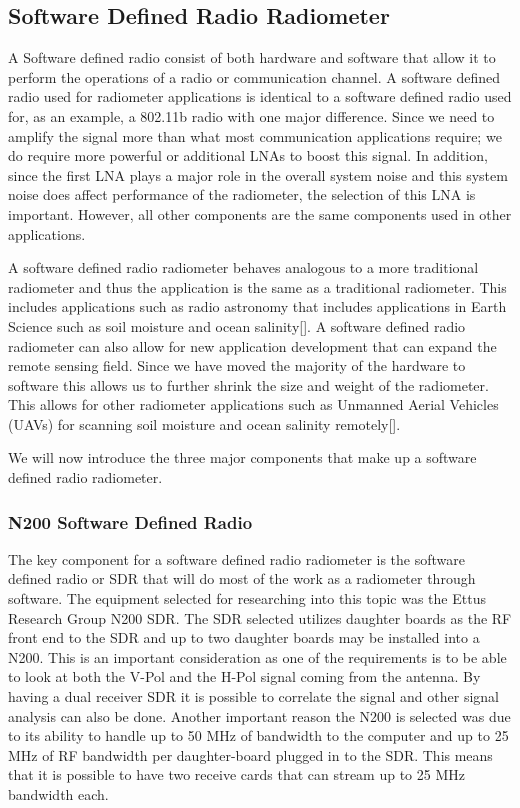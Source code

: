 
\subsection{Software Defined Radio Radiometer}

A Software defined radio consist of both hardware and software that allow it to perform the operations of a radio or communication channel.  A software defined radio used for radiometer applications is identical to a software defined radio used for, as an example, a 802.11b radio with one major difference.  Since we need to amplify the signal more than what most communication applications require; we do require more powerful or additional LNAs to boost this signal.  In addition, since the first LNA plays a major role in the overall system noise and this system noise does affect performance of the radiometer, the selection of this LNA is important.  However, all other components are the same components used in other applications.

A software defined radio radiometer behaves analogous to a more traditional radiometer and thus the application is the same as a traditional radiometer.  This includes applications such as radio astronomy that includes applications in Earth Science such as soil moisture and ocean salinity[\cite{Ruf}].  A software defined radio radiometer can also allow for new application development that can expand the remote sensing field.  Since we have moved the majority of the hardware to software this allows us to further shrink the size and weight of the radiometer.  This allows for other radiometer applications such as Unmanned Aerial Vehicles (UAVs) for scanning soil moisture and ocean salinity remotely[\cite{McIntyre}].  

We will now introduce the three major components that make up a software defined radio radiometer.  

\subsubsection{N200 Software Defined Radio} 
The key component for a software defined radio radiometer is the software defined radio or SDR that will do most of the work as a radiometer through software.  The equipment selected for researching into this topic was the Ettus Research Group N200 SDR.  The SDR selected utilizes daughter boards as the RF front end to the SDR and up to two daughter boards may be installed into a N200.  This is an important consideration as one of the requirements is to be able to look at both the V-Pol and the H-Pol signal coming from the antenna.  By having a dual receiver SDR it is possible to correlate the signal and other signal analysis can also be done.  Another important reason the N200 is selected was due to its ability to handle up to 50 MHz of bandwidth to the computer and up to 25 MHz of RF bandwidth per daughter-board plugged in to the SDR.  This means that it is possible to have two receive cards that can stream up to 25 MHz bandwidth each.  

